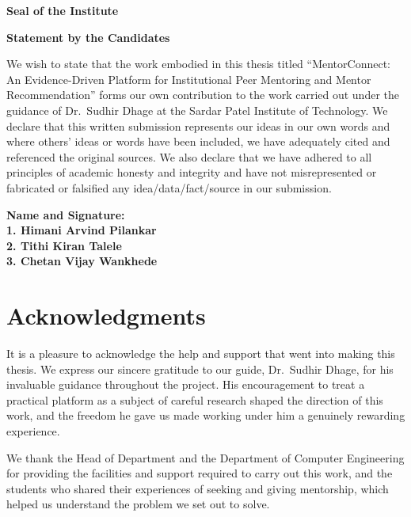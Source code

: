 \documentclass[12pt,a4paper]{report}
\begin{document}
\vfill
\begin{center}\textbf{Seal of the Institute}\end{center}
\vspace{2cm}
\clearpage

\thispagestyle{empty}
\begin{center}
\vspace*{1cm}
{\Large\bfseries Statement by the Candidates\par}
\end{center}
\vspace{1.5cm}
\noindent We wish to state that the work embodied in this thesis titled ``MentorConnect: An Evidence-Driven Platform for Institutional Peer Mentoring and Mentor Recommendation'' forms our own contribution to the work carried out under the guidance of Dr.\ Sudhir Dhage at the Sardar Patel Institute of Technology. We declare that this written submission represents our ideas in our own words and where others' ideas or words have been included, we have adequately cited and referenced the original sources. We also declare that we have adhered to all principles of academic honesty and integrity and have not misrepresented or fabricated or falsified any idea/data/fact/source in our submission.

\vspace{6cm}
\noindent\textbf{Name and Signature:}\\
\textbf{1. Himani Arvind Pilankar}\\
\textbf{2. Tithi Kiran Talele}\\
\textbf{3. Chetan Vijay Wankhede}
\clearpage

\chapter*{Acknowledgments}
\thispagestyle{empty}
It is a pleasure to acknowledge the help and support that went into making this thesis. We express our sincere gratitude to our guide, Dr.\ Sudhir Dhage, for his invaluable guidance throughout the project. His encouragement to treat a practical platform as a subject of careful research shaped the direction of this work, and the freedom he gave us made working under him a genuinely rewarding experience.

We thank the Head of Department and the Department of Computer Engineering for providing the facilities and support required to carry out this work, and the students who shared their experiences of seeking and giving mentorship, which helped us understand the problem we set out to solve.
\end{document}
